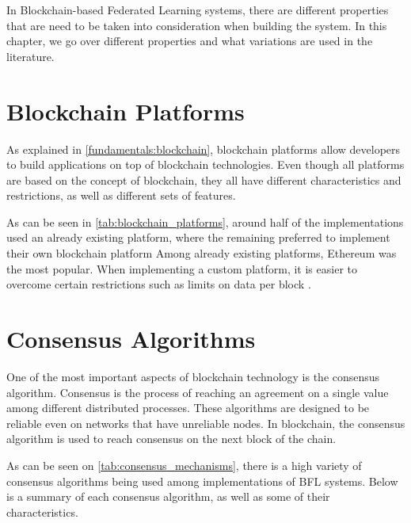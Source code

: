 In Blockchain-based Federated Learning systems, there are different properties that are need to be taken into consideration when building the system. In this chapter, we go over different properties and what variations are used in the literature.

\section{Blockchain Platforms}\label{related_work:blockchain_platforms}
 
As explained in \autoref{fundamentals:blockchain}, blockchain platforms allow developers to build applications on top of blockchain technologies. Even though all platforms are based on the concept of blockchain, they all have different characteristics and restrictions, as well as different sets of features.

As can be seen in \autoref{tab:blockchain_platforms}, around half of the implementations used an already existing platform, where the remaining preferred to implement their own blockchain platform Among already existing platforms, Ethereum was the most popular. When implementing a custom platform, it is easier to overcome certain restrictions such as limits on data per block \cite{8733825, 9524833}.



\section{Consensus Algorithms}

One of the most important aspects of blockchain technology is the consensus algorithm. Consensus is the process of reaching an agreement on a single value among different distributed processes. These algorithms are designed to be reliable even on networks that have unreliable nodes. In blockchain, the consensus algorithm is used to reach consensus on the next block of the chain.



As can be seen on \autoref{tab:consensus_mechanisms}, there is a high variety of consensus algorithms being used among implementations of BFL systems. Below is a summary of each consensus algorithm, as well as some of their characteristics.

